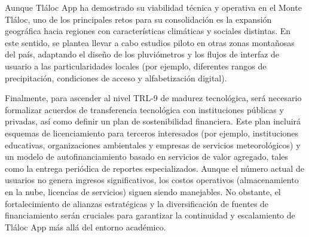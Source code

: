 Aunque Tláloc App ha demostrado su viabilidad técnica y operativa en el Monte Tláloc, uno de los principales retos para su consolidación es la expansión geográfica hacia regiones con características climáticas y sociales distintas. En este sentido, se plantea llevar a cabo estudios piloto en otras zonas montañosas del país, adaptando el diseño de los pluviómetros y los flujos de interfaz de usuario a las particularidades locales (por ejemplo, diferentes rangos de precipitación, condiciones de acceso y alfabetización digital). 

Finalmente, para ascender al nivel TRL-9 de madurez tecnológica, será necesario formalizar acuerdos de transferencia tecnológica con instituciones públicas y privadas, así como definir un plan de sostenibilidad financiera. Este plan incluirá esquemas de licenciamiento para terceros interesados (por ejemplo, instituciones educativas, organizaciones ambientales y empresas de servicios meteorológicos) y un modelo de autofinanciamiento basado en servicios de valor agregado, tales como la entrega periódica de reportes especializados. Aunque el número actual de usuarios no genera ingresos significativos, los costos operativos (almacenamiento en la nube, licencias de servicios) siguen siendo manejables. No obstante, el fortalecimiento de alianzas estratégicas y la diversificación de fuentes de financiamiento serán cruciales para garantizar la continuidad y escalamiento de Tláloc App más allá del entorno académico.